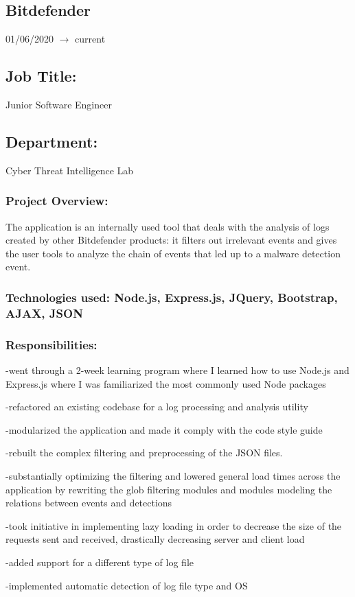 \documentclass[a4paper,hidelinks,11pt]{article}
\begin{document}
\subsection{Bitdefender} 01/06/2020 $\rightarrow$ current
\subsection{Job Title:} Junior Software Engineer
\subsection{Department:} Cyber Threat Intelligence Lab
\subsubsection{Project Overview:}
The application is an internally used tool that deals with the analysis of logs created by other Bitdefender products: it filters out irrelevant events and gives the user tools to analyze the chain of events that led up to a malware detection event.
\subsubsection{Technologies used: Node.js, Express.js, JQuery, Bootstrap, AJAX, JSON}
\subsubsection{Responsibilities:}
-went through a 2-week learning program where I learned how to use Node.js and Express.js where I was familiarized the most commonly used Node packages

-refactored an existing codebase for a log processing and analysis utility

-modularized the application and made it comply with the code style guide

-rebuilt the complex filtering and preprocessing of the JSON files.

-substantially optimizing the filtering and lowered general load times across the application by rewriting the glob filtering modules and modules modeling the relations between events and detections

-took initiative in implementing lazy loading in order to decrease the size of the requests sent and received, drastically decreasing server and client load

-added support for a different type of log file

-implemented automatic detection of log file type and OS
\end{document}
